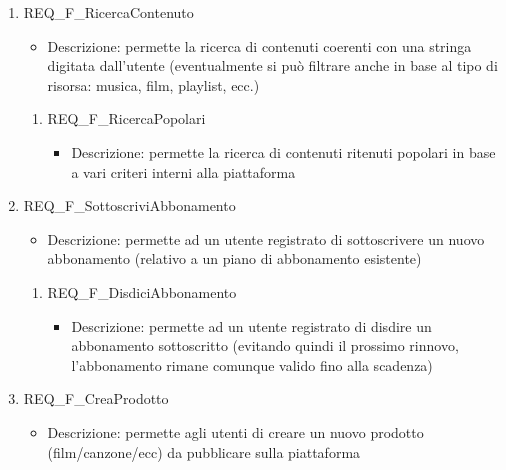 \begin{enumerate}
	\item REQ\_F\_RicercaContenuto
		\begin{itemize}	
			\item Descrizione: permette la ricerca di contenuti coerenti con una stringa digitata dall'utente (eventualmente si può filtrare anche in base al tipo di risorsa: musica, film, playlist, ecc.)
		\end{itemize}
		\begin{enumerate}[label*=\arabic*.]
			\item REQ\_F\_RicercaPopolari
			\begin{itemize}
				\item Descrizione: permette la ricerca di contenuti ritenuti popolari in base a vari criteri interni alla piattaforma 
			\end{itemize}	
		\end{enumerate}		

	\item REQ\_F\_SottoscriviAbbonamento
		\begin{itemize}	
			\item Descrizione: permette ad un utente registrato di sottoscrivere un nuovo abbonamento (relativo a un piano di abbonamento esistente)
		\end{itemize}
		\begin{enumerate}[label*=\arabic*.]			
		\item REQ\_F\_DisdiciAbbonamento
			\begin{itemize}	
				\item Descrizione: permette ad un utente registrato di disdire un abbonamento sottoscritto (evitando quindi il prossimo rinnovo, l'abbonamento rimane comunque valido fino alla scadenza)
			\end{itemize}
		\end{enumerate}
	
	
	\item REQ\_F\_CreaProdotto
	\begin{itemize}
		\item Descrizione: permette agli utenti di creare un nuovo prodotto (film/canzone/ecc) da pubblicare sulla piattaforma
	\end{itemize}
	\begin{enumerate}[label*=\arabic*.]
		

\end{enumerate}
\end{enumerate}
